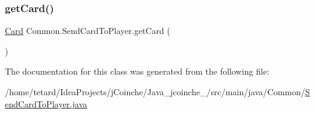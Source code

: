 \subsubsection{\texorpdfstring{get\+Card()}{getCard()}}
{\footnotesize\ttfamily \mbox{\hyperlink{classCommon_1_1Card}{Card}} Common.\+Send\+Card\+To\+Player.\+get\+Card (\begin{DoxyParamCaption}{ }\end{DoxyParamCaption})\hspace{0.3cm}{\ttfamily [inline]}}



The documentation for this class was generated from the following file\+:\begin{DoxyCompactItemize}
\item 
/home/tetard/\+Idea\+Projects/j\+Coinche/\+Java\+\_\+jcoinche\+\_/src/main/java/\+Common/\mbox{\hyperlink{SendCardToPlayer_8java}{Send\+Card\+To\+Player.\+java}}\end{DoxyCompactItemize}
